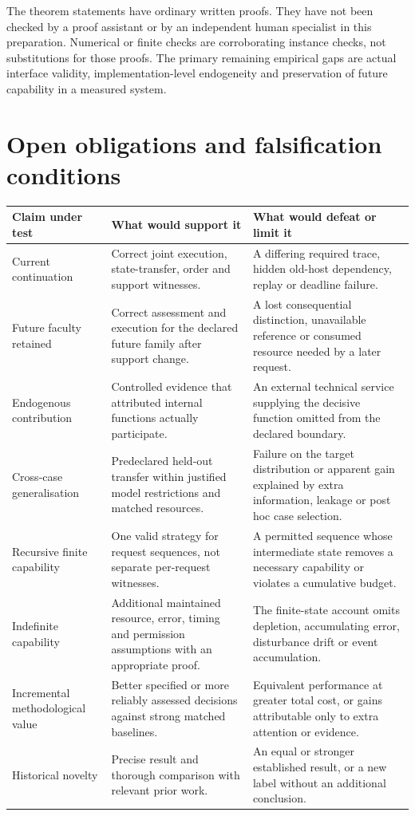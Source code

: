 The theorem statements have ordinary written proofs. They have not been checked by a proof assistant or by an independent human specialist in this preparation. Numerical or finite checks are corroborating instance checks, not substitutions for those proofs. The primary remaining empirical gaps are actual interface validity, implementation-level endogeneity and preservation of future capability in a measured system.

\clearpage
\section{Open obligations and falsification conditions}

\begin{longtable}{@{}p{.25\linewidth}p{.32\linewidth}p{.35\linewidth}@{}}
\toprule
Claim under test & What would support it & What would defeat or limit it\\
\midrule
\endhead
Current continuation & Correct joint execution, state-transfer, order and support witnesses. & A differing required trace, hidden old-host dependency, replay or deadline failure.\\
Future faculty retained & Correct assessment and execution for the declared future family after support change. & A lost consequential distinction, unavailable reference or consumed resource needed by a later request.\\
Endogenous contribution & Controlled evidence that attributed internal functions actually participate. & An external technical service supplying the decisive function omitted from the declared boundary.\\
Cross-case generalisation & Predeclared held-out transfer within justified model restrictions and matched resources. & Failure on the target distribution or apparent gain explained by extra information, leakage or post hoc case selection.\\
Recursive finite capability & One valid strategy for request sequences, not separate per-request witnesses. & A permitted sequence whose intermediate state removes a necessary capability or violates a cumulative budget.\\
Indefinite capability & Additional maintained resource, error, timing and permission assumptions with an appropriate proof. & The finite-state account omits depletion, accumulating error, disturbance drift or event accumulation.\\
Incremental methodological value & Better specified or more reliably assessed decisions against strong matched baselines. & Equivalent performance at greater total cost, or gains attributable only to extra attention or evidence.\\
Historical novelty & Precise result and thorough comparison with relevant prior work. & An equal or stronger established result, or a new label without an additional conclusion.\\
\bottomrule
\end{longtable}

